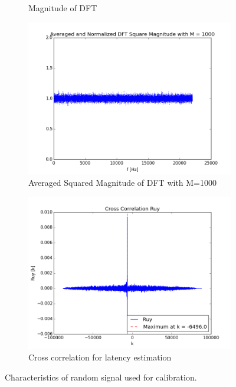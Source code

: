 \begin{figure}[htb]
\begin{subfigure}[b]{0.49\linewidth}
        \caption{Magnitude of DFT}
        \label{fig:random_fft}
	\end{subfigure}
    \begin{subfigure}[b]{0.49\linewidth}
        \centering
        \includegraphics[width=\linewidth]{files/random_M1000.png}
        \caption{Averaged Squared Magnitude of DFT with M=1000}
        \label{fig:random_M1000}
    \end{subfigure}
    \begin{subfigure}[b]{0.49\linewidth}
        \includegraphics[width=\linewidth]{files/audio_ruy.png}
        \caption{Cross correlation for latency estimation}
        \label{fig:audio_ruy}
    \end{subfigure}
    \caption{Characteristics of random signal used for calibration.} 
	\label{fig:random}
\end{figure}

